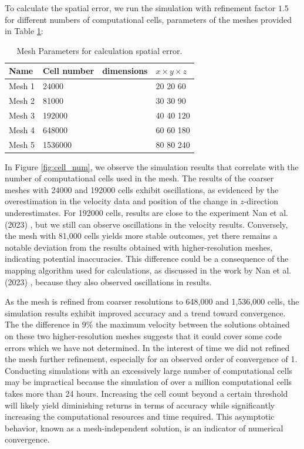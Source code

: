 To calculate the spatial error, we run the simulation with refinement factor $1.5$ for different numbers of computational cells, parameters of the meshes provided in Table \ref{table1-chap4}:

\begin{table}[H]
    \centering
    \caption{Mesh Parameters for calculation spatial error. } \label{table1-chap4}
    \begin{tabular}{llll}
        \toprule
        \hline
        Name     & Cell number & dimensions&$x\times y \times z $\\
        \hline
        \midrule
        Mesh 1   & 24000 && 20 20 60\\
        Mesh 2 & 81000 & &30 30 90\\
        Mesh 3 & 192000 &&40 40 120 \\
        Mesh 4 & 648000 & &60 60 180 \\
        Mesh 5 & 1536000 & &80 80 240\\
        \hline
        \bottomrule
     \end{tabular}
\end{table}

In Figure \ref{fig:cell_num}, we observe the simulation results that correlate with the number of computational cells used in the mesh. The results of the coarser meshes with 24000 and 192000 cells exhibit oscillations, as evidenced by the overestimation in the velocity data and position of the change in $z$-direction underestimates. For 192000 cells, results are close to the experiment Nan et al. (2023) \cite{nan2023high}, but we still can observe oscillations in the velocity results. Conversely, the mesh with 81,000 cells yields more stable outcomes, yet there remains a notable deviation from the results obtained with higher-resolution meshes, indicating potential inaccuracies. This difference could be a consequence of the mapping algorithm used for calculations, as discussed in the work by Nan et al. (2023) \cite{nan2023high}, because they also observed oscillations in results.

As the mesh is refined from coarser resolutions to 648,000 and 1,536,000 cells, the simulation results exhibit improved accuracy and a trend toward convergence. The the difference in $9$\% the maximum velocity between the solutions obtained on these two higher-resolution meshes suggests that it could cover some code errors which we have not determined. In the interest of time we did not refined the mesh further refinement, especially for an observed order of convergence of 1. Conducting simulations with an excessively large number of computational cells may be impractical because the simulation of over a million computational cells takes more than 24 hours. Increasing the cell count beyond a certain threshold will likely yield diminishing returns in terms of accuracy while significantly increasing the computational resources and time required. This asymptotic behavior, known as a mesh-independent solution, is an indicator of numerical convergence.

